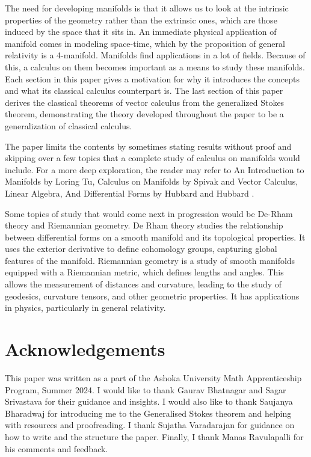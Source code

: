 \documentclass{article}
\begin{document}
The need for developing manifolds is that it allows us to look at the intrinsic properties of the geometry rather than the extrinsic ones, which are those induced by the space that it sits in. An immediate physical application of manifold comes in modeling space-time, which by the proposition of general relativity is a 4-manifold. Manifolds find applications in a lot of fields. Because of this, a calculus on them becomes important as a means to study these manifolds. Each section in this paper gives a motivation for why it introduces the concepts and what its classical calculus counterpart is. The last section of this paper derives the classical theorems of vector calculus from the generalized Stokes theorem, demonstrating the theory developed throughout the paper to be a generalization of classical calculus. 

The paper limits the contents by sometimes stating results without proof and skipping over a few topics that a complete study of calculus on manifolds would include. For a more deep exploration, the reader may refer to An Introduction to Manifolds by Loring Tu\cite{tu2010introduction}, Calculus on Manifolds by Spivak\cite{spivak1971calculus} and Vector Calculus, Linear Algebra, And Differential Forms by Hubbard and Hubbard \cite{hubbard2009vector}.

Some topics of study that would come next in progression would be De-Rham theory and Riemannian geometry. De Rham theory studies the relationship between differential forms on a smooth manifold and its topological properties. It uses the exterior derivative to define cohomology groups, capturing global features of the manifold. Riemannian geometry is a study of smooth manifolds equipped with a Riemannian metric, which defines lengths and angles. This allows the measurement of distances and curvature, leading to the study of geodesics, curvature tensors, and other geometric properties. It has applications in physics, particularly in general relativity.

\section{Acknowledgements}
This paper was written as a part of the Ashoka University Math Apprenticeship Program, Summer 2024. I would like to thank Gaurav Bhatnagar and Sagar Srivastava for their guidance and insights. I would also like to thank Saujanya Bharadwaj for introducing me to the Generalised Stokes theorem and helping with resources and proofreading. I thank Sujatha Varadarajan for guidance on how to write and the structure the paper. Finally, I thank Manas Ravulapalli for his comments and feedback.


\end{document}
